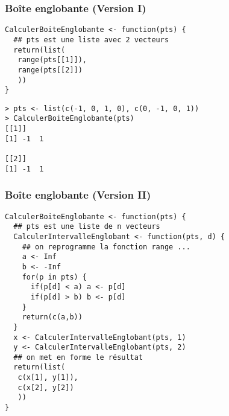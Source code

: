 \documentclass[10pt]{beamer}
\begin{document}
\begin{frame}[fragile]
  \frametitle{Boîte englobante (Version I)}
  

  \begin{lstlisting}[style=editor]
CalculerBoiteEnglobante <- function(pts) {
  ## pts est une liste avec 2 vecteurs
  return(list(
   range(pts[[1]]),
   range(pts[[2]])
   ))
}
  \end{lstlisting}


  \begin{lstlisting}
> pts <- list(c(-1, 0, 1, 0), c(0, -1, 0, 1))
> CalculerBoiteEnglobante(pts)
[[1]]
[1] -1  1

[[2]]
[1] -1  1
  \end{lstlisting}

\end{frame}


\begin{frame}[fragile]
  \frametitle{Boîte englobante (Version II)}
  

  \begin{lstlisting}[style=editor]
CalculerBoiteEnglobante <- function(pts) {
  ## pts est une liste de n vecteurs
  CalculerIntervalleEnglobant <- function(pts, d) {
    ## on reprogramme la fonction range ...
    a <- Inf
    b <- -Inf
    for(p in pts) {
      if(p[d] < a) a <- p[d]
      if(p[d] > b) b <- p[d]
    }
    return(c(a,b))
  }
  x <- CalculerIntervalleEnglobant(pts, 1)
  y <- CalculerIntervalleEnglobant(pts, 2)
  ## on met en forme le résultat
  return(list(
   c(x[1], y[1]),
   c(x[2], y[2])
   ))
}
  \end{lstlisting}


\end{frame}


\questionSlide

 \appendix
 \backupSlides

\end{document}
